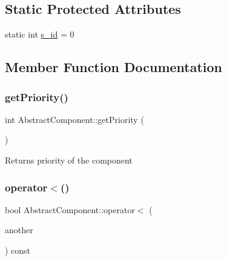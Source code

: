 \subsection*{Static Protected Attributes}
\begin{DoxyCompactItemize}
\item 
static int \hyperlink{class_abstract_component_a99ce3e5fe7d73dac569b874c15fcaf0d}{s\+\_\+id} = 0
\end{DoxyCompactItemize}


\subsection{Member Function Documentation}
\mbox{\label{class_abstract_component_ac0b440d1d642ff1292ec3c544d75a8f1}} 
\subsubsection{\texorpdfstring{get\+Priority()}{getPriority()}}
{\footnotesize\ttfamily int Abstract\+Component\+::get\+Priority (\begin{DoxyParamCaption}{ }\end{DoxyParamCaption})\hspace{0.3cm}{\ttfamily [inline]}}

\begin{DoxyReturn}{Returns}
priority of the component 
\end{DoxyReturn}
\mbox{\label{class_abstract_component_a0c2e458144111c5f599c66f168516abc}} 
\subsubsection{\texorpdfstring{operator$<$()}{operator<()}}
{\footnotesize\ttfamily bool Abstract\+Component\+::operator$<$ (\begin{DoxyParamCaption}\item[{const \hyperlink{class_abstract_component}{Abstract\+Component} \&}]{another }\end{DoxyParamCaption}) const}

